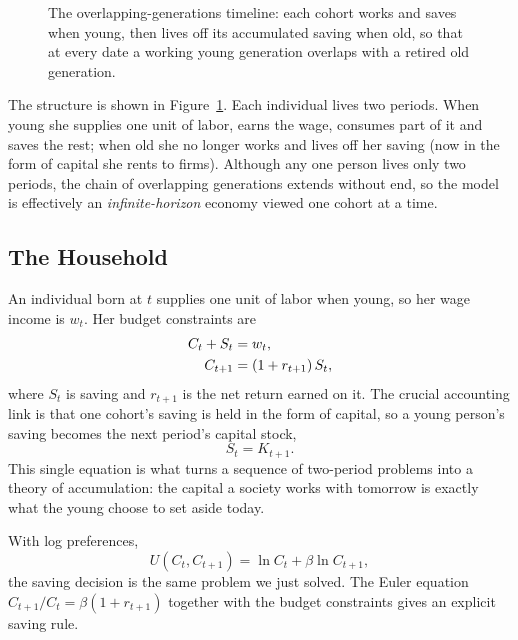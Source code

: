 \begin{figure}[h]
\centering

\caption{The overlapping-generations timeline: each cohort works and saves when young, then lives off its accumulated saving when old, so that at every date a working young generation overlaps with a retired old generation.}
\label{fig:macro-5}
\end{figure}

The structure is shown in Figure~\ref{fig:macro-5}. Each individual lives two periods. When young she supplies one unit of labor, earns the wage, consumes part of it and saves the rest; when old she no longer works and lives off her saving (now in the form of capital she rents to firms). Although any one person lives only two periods, the chain of overlapping generations extends without end, so the model is effectively an \emph{infinite-horizon} economy viewed one cohort at a time.

\subsection{The Household}

An individual born at $t$ supplies one unit of labor when young, so her wage income is $w_t$. Her budget constraints are
\[
\begin{aligned}
C_t + S_t &= w_t, \\
C_{t+1} &= (1+r_{t+1})\,S_t,
\end{aligned}
\]
where $S_t$ is saving and $r_{t+1}$ is the net return earned on it. The crucial accounting link is that one cohort's saving is held in the form of capital, so a young person's saving becomes the next period's capital stock,
\[
S_t = K_{t+1}.
\]
This single equation is what turns a sequence of two-period problems into a theory of accumulation: the capital a society works with tomorrow is exactly what the young choose to set aside today.

With log preferences,
\[
U(C_t, C_{t+1}) = \ln C_t + \beta \ln C_{t+1},
\]
the saving decision is the same problem we just solved. The Euler equation $C_{t+1}/C_t = \beta(1+r_{t+1})$ together with the budget constraints gives an explicit saving rule.


